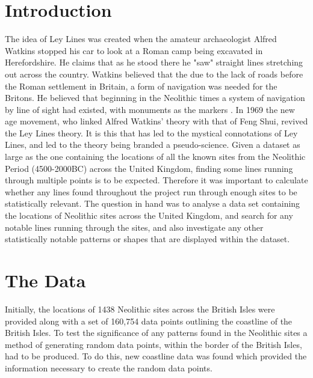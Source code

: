 \documentclass[a4paper]{article}
\begin{document}
\section{Introduction}
The idea of Ley Lines was created when the amateur archaeologist Alfred Watkins stopped his car to look at a Roman camp being excavated in Herefordshire. He claims that as he stood there he "saw" straight lines stretching out across the country. Watkins believed that the due to the lack of roads before the Roman settlement in Britain, a form of navigation was needed for the Britons. He believed that beginning in the Neolithic times a system of navigation by line of sight had existed, with monuments as the markers \cite{Alfred Watkins}.
\newline\newline
In 1969 the new age movement, who linked Alfred Watkins’ theory with that of Feng Shui, revived the Ley Lines theory. It is this that has led to the mystical connotations of Ley Lines, and led to the theory being branded a pseudo-science.
\newline\newline
Given a dataset as large as the one containing the locations of all the known sites from the Neolithic Period (4500-2000BC) across the United Kingdom, finding some lines running through multiple points is to be expected. Therefore it was important to calculate whether any lines found throughout the project run through enough sites to be statistically relevant.
\newline\newline
The question in hand was to analyse a data set containing the locations of Neolithic sites across the United Kingdom, and search for any notable lines running through the sites, and also investigate any other statistically notable patterns or shapes that are displayed within the dataset. 

\section{The Data}
Initially, the locations of 1438 Neolithic sites across the British Isles were provided along with a set of 160,754 data points outlining the coastline of the British Isles. To test the significance of any patterns found in the Neolithic sites a method of generating random data points, within the border of the British Isles, had to be produced. To do this, new coastline data was found which provided the information necessary to create the random data points.
\end{document}
